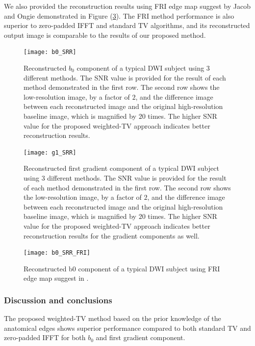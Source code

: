 We also provided the reconstruction results using FRI edge map suggest by Jacob and Ongie \cite{ongie2015} demonstrated in Figure (\ref{b0_SRR_FRI}). The FRI method performance is also superior to zero-padded IFFT and standard TV algorithms, and its reconstructed output image is comparable to the results of our proposed method.

\begin{figure}[ht]
\centering
\texttt{[image: b0\_SRR]}\
\centering
\caption{Reconstructed $b_0$ component of a typical DWI subject using $3$ different methods. The SNR value is provided for the result of each method demonstrated in the first row. The second row shows the low-resolution image, by a factor of $2$, and the difference image between each reconstructed image and the original high-resolution baseline image, which is magnified by $20$ times. The higher SNR value for the proposed weighted-TV approach indicates better reconstruction results.}
\label{b0_SRR}
\end{figure}

\begin{figure}[ht]
\centering
\texttt{[image: g1\_SRR]}\
\centering
\caption{Reconstructed first gradient component of a typical DWI subject using $3$ different methods. The SNR value is provided for the result of each method demonstrated in the first row. The second row shows the low-resolution image, by a factor of $2$, and the difference image between each reconstructed image and the original high-resolution baseline image, which is magnified by $20$ times. The higher SNR value for the proposed weighted-TV approach indicates better reconstruction results for the gradient components as well.}
\label{g1_SRR}
\end{figure}

\begin{figure}[ht]
\centering
\texttt{[image: b0\_SRR\_FRI]}\
\centering
\caption{Reconstructed b0 component of a typical DWI subject using FRI edge map suggest in \cite{ongie2015}.}
\label{b0_SRR_FRI}
\end{figure}


\subsubsection{Discussion and conclusions}
The proposed weighted-TV method based on the prior knowledge of the anatomical edges shows superior performance compared to both standard TV and zero-padded IFFT for both $b_0$ and first gradient component.
 
